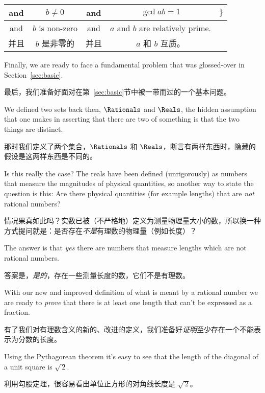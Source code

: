 \vspace{.2in}

\begin{tabular}{c|c|c|c|c}
\rule[-10pt]{0pt}{22pt} and & $b \neq 0$ & and & $\gcd{a}{b}=1$ & $\}$
\\ \hline
\rule[-6pt]{0pt}{22pt}  and & $b$ is non-zero & and & $a$ and $b$ are relatively prime. &  \\
\rule[-6pt]{0pt}{22pt}  并且 & $b$ 是非零的 & 并且 & $a$ 和 $b$ 互质。 & \\
\end{tabular}

\vspace{.2in}

Finally, we are ready to face a fundamental problem that was
glossed-over in Section~\ref{sec:basic}.

最后，我们准备好面对在第~\ref{sec:basic}节中被一带而过的一个基本问题。

We defined two sets
back then, $\Rationals$ and $\Reals$, the hidden assumption that one
makes in asserting that there are two of something is that the two
things are distinct.

那时我们定义了两个集合，$\Rationals$ 和 $\Reals$，断言有两样东西时，隐藏的假设是这两样东西是不同的。

Is this really the case?  The reals have been
defined (unrigorously) as numbers that measure the magnitudes of
physical quantities, so another way to state the question is this:
Are there physical quantities (for example lengths) that are {\em not}
rational numbers?

情况果真如此吗？实数已被（不严格地）定义为测量物理量大小的数，所以换一种方式提问就是：是否存在{\em 不是}有理数的物理量（例如长度）？

The answer is that {\em yes} there are numbers that measure lengths
which are not rational numbers.

答案是，{\em 是的}，存在一些测量长度的数，它们不是有理数。

With our new and improved definition
of what is meant by a rational number we are ready to {\em prove} that 
there is at least one length that can't be expressed as a fraction.

有了我们对有理数含义的新的、改进的定义，我们准备好{\em 证明}至少存在一个不能表示为分数的长度。

Using the Pythagorean theorem it's easy to see that the length of the
diagonal of a unit square is $\sqrt{\,2}$.

利用勾股定理，很容易看出单位正方形的对角线长度是 $\sqrt{\,2}$。

